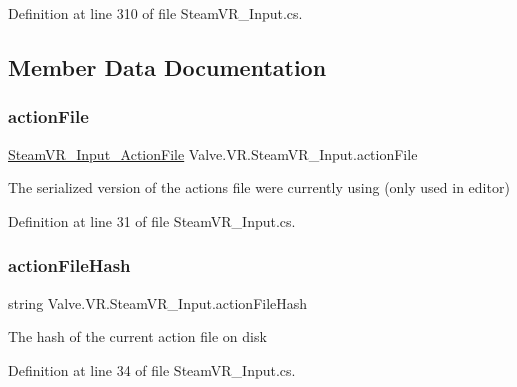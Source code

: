 Definition at line 310 of file Steam\+V\+R\+\_\+\+Input.\+cs.



\subsection{Member Data Documentation}
\mbox{\label{class_valve_1_1_v_r_1_1_steam_v_r___input_a72db21f575efb1323adffa0a93c70471}} 
\subsubsection{\texorpdfstring{actionFile}{actionFile}}
{\footnotesize\ttfamily \mbox{\hyperlink{class_valve_1_1_v_r_1_1_steam_v_r___input___action_file}{Steam\+V\+R\+\_\+\+Input\+\_\+\+Action\+File}} Valve.\+V\+R.\+Steam\+V\+R\+\_\+\+Input.\+action\+File\hspace{0.3cm}{\ttfamily [static]}}



The serialized version of the actions file we\textquotesingle{}re currently using (only used in editor) 



Definition at line 31 of file Steam\+V\+R\+\_\+\+Input.\+cs.

\mbox{\label{class_valve_1_1_v_r_1_1_steam_v_r___input_ae24acec08f56ba0533c424fd8fed4f2c}} 
\subsubsection{\texorpdfstring{actionFileHash}{actionFileHash}}
{\footnotesize\ttfamily string Valve.\+V\+R.\+Steam\+V\+R\+\_\+\+Input.\+action\+File\+Hash\hspace{0.3cm}{\ttfamily [static]}}



The hash of the current action file on disk 



Definition at line 34 of file Steam\+V\+R\+\_\+\+Input.\+cs.

